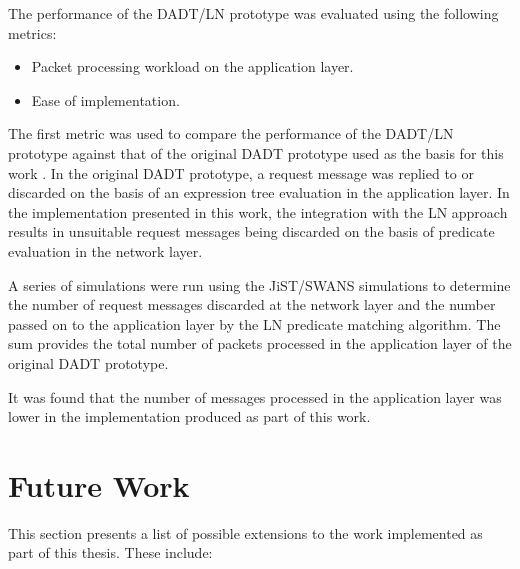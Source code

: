 The performance of the DADT/LN prototype was evaluated using the following
metrics: 
\begin{itemize}
  \item Packet processing workload on the application layer.
  \item Ease of implementation. 
\end{itemize}

The first metric was used to compare the performance of the DADT/LN prototype
against that of the original DADT prototype used as the basis for this work
\cite{migliavacca_DADT:2006}. In the original DADT prototype, a request message
was replied to or discarded on the basis of an expression tree evaluation in the
application layer. In the implementation presented in this work, the integration
with the LN approach results in unsuitable request messages being discarded on
the basis of predicate evaluation in the network layer. 

A series of simulations were run using the JiST/SWANS simulations to determine
the number of request messages discarded at the network layer and the number
passed on to the application layer by the LN predicate matching algorithm. The
sum provides the total number of packets processed in the application layer of
the original DADT prototype.

It was found that the number of messages processed in the application layer was
lower in the implementation produced as part of this work.


%


\section{Future Work}

This section presents a list of possible extensions to the work implemented as
part of this thesis. These include:

